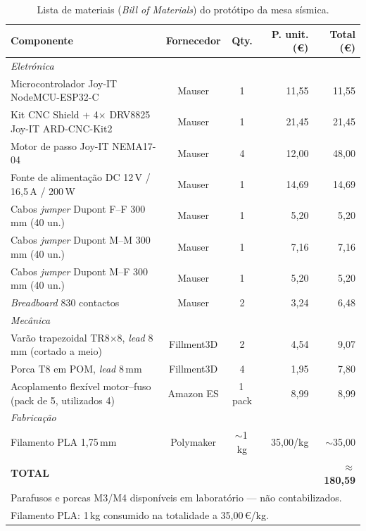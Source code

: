 \begin{table}[h]
\centering
\caption{Lista de materiais (\textit{Bill of Materials}) do protótipo da mesa sísmica.}
\label{tab:bom}
\begin{tabular}{p{6.2cm}ccrr}
\hline
\textbf{Componente} & \textbf{Fornecedor} & \textbf{Qty.} & \textbf{P. unit. (\euro{})} & \textbf{Total (\euro{})} \\
\hline
\multicolumn{5}{l}{\textit{Eletrónica}} \\
\hline
Microcontrolador Joy-IT NodeMCU-ESP32-C~\cite{JoyITESP32}
  & Mauser & 1 & 11,55 & 11,55 \\
Kit CNC Shield + 4$\times$ DRV8825 Joy-IT ARD-CNC-Kit2~\cite{JoyITCNCKit2}
  & Mauser & 1 & 21,45 & 21,45 \\
Motor de passo Joy-IT NEMA17-04~\cite{JoyITNEMA17}
  & Mauser & 4 & 12,00 & 48,00 \\
Fonte de alimentação DC 12\,V / 16,5\,A / 200\,W~\cite{FonteMauser}
  & Mauser & 1 & 14,69 & 14,69 \\
Cabos \textit{jumper} Dupont F--F 300\,mm (40 un.)~\cite{JumperFF}
  & Mauser & 1 & 5,20 & 5,20 \\
Cabos \textit{jumper} Dupont M--M 300\,mm (40 un.)~\cite{JumperMM}
  & Mauser & 1 & 7,16 & 7,16 \\
Cabos \textit{jumper} Dupont M--F 300\,mm (40 un.)~\cite{JumperMF}
  & Mauser & 1 & 5,20 & 5,20 \\
\textit{Breadboard} 830 contactos~\cite{BreadboardMauser}
  & Mauser & 2 & 3,24 & 6,48 \\
\hline
\multicolumn{5}{l}{\textit{Mecânica}} \\
\hline
Varão trapezoidal TR8$\times$8, \textit{lead} 8\,mm (cortado a meio)~\cite{Fillment3DVarao}
  & Fillment3D & 2 & 4,54 & 9,07 \\
Porca T8 em POM, \textit{lead} 8\,mm~\cite{Fillment3DPorca}
  & Fillment3D & 4 & 1,95 & 7,80 \\
Acoplamento flexível motor--fuso (pack de 5, utilizados 4)~\cite{AcopladorAmazon}
  & Amazon ES & 1\,pack & 8,99 & 8,99 \\
\hline
\multicolumn{5}{l}{\textit{Fabricação}} \\
\hline
Filamento PLA 1,75\,mm
  & Polymaker & $\sim$1\,kg & 35,00/kg & $\sim$35,00 \\
\hline
\textbf{TOTAL} & & & & \textbf{$\approx$180,59} \\
\hline
\multicolumn{5}{l}{\footnotesize Parafusos e porcas M3/M4 disponíveis em laboratório --- não contabilizados.} \\
\multicolumn{5}{l}{\footnotesize Filamento PLA: 1\,kg consumido na totalidade a 35,00\,€/kg.} \\
\end{tabular}
\end{table}

